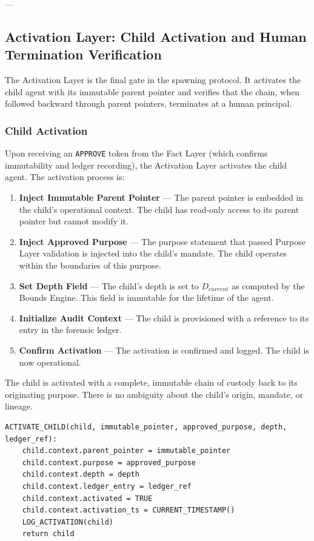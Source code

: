 ---

\subsection{Activation Layer: Child Activation and Human Termination Verification}

The Activation Layer is the final gate in the spawning protocol. It activates the child agent with its immutable parent pointer and verifies that the chain, when followed backward through parent pointers, terminates at a human principal.

\subsubsection{Child Activation}

Upon receiving an \texttt{APPROVE} token from the Fact Layer (which confirms immutability and ledger recording), the Activation Layer activates the child agent. The activation process is:

\begin{enumerate}
    \item \textbf{Inject Immutable Parent Pointer} — The parent pointer is embedded in the child's operational context. The child has read-only access to its parent pointer but cannot modify it.
    \item \textbf{Inject Approved Purpose} — The purpose statement that passed Purpose Layer validation is injected into the child's mandate. The child operates within the boundaries of this purpose.
    \item \textbf{Set Depth Field} — The child's depth is set to $D_{current}$ as computed by the Bounds Engine. This field is immutable for the lifetime of the agent.
    \item \textbf{Initialize Audit Context} — The child is provisioned with a reference to its entry in the forensic ledger.
    \item \textbf{Confirm Activation} — The activation is confirmed and logged. The child is now operational.
\end{enumerate}

The child is activated with a complete, immutable chain of custody back to its originating purpose. There is no ambiguity about the child's origin, mandate, or lineage.

\begin{verbatim}
ACTIVATE_CHILD(child, immutable_pointer, approved_purpose, depth, ledger_ref):
    child.context.parent_pointer = immutable_pointer
    child.context.purpose = approved_purpose
    child.context.depth = depth
    child.context.ledger_entry = ledger_ref
    child.context.activated = TRUE
    child.context.activation_ts = CURRENT_TIMESTAMP()
    LOG_ACTIVATION(child)
    return child
\end{verbatim}

